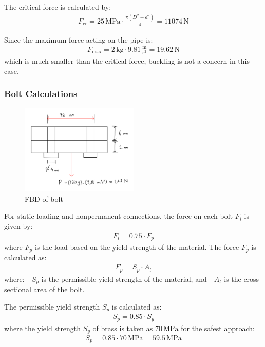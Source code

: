 \documentclass[12pt]{report}
\begin{document}
The critical force is calculated by:
\begin{align}
F_{\text{cr}} = 25 \, \text{MPa} \cdot \frac{\pi (D^2 - d^2)}{4} = 11074 \, \text{N}
\end{align}


Since the maximum force acting on the pipe is:
\begin{align}
F_{\text{max}} = 2 \, \text{kg} \cdot 9.81 \, \frac{\text{m}}{\text{s}^2} = 19.62 \, \text{N}
\end{align}
which is much smaller than the critical force, buckling is not a concern in this case.

\subsubsection{Bolt Calculations}
\begin{figure}[h]
    \centering
    \includegraphics[width=0.5\textwidth]{Figures/bolts.jpg}
    \caption{FBD of bolt}
    \label{fig:bolt}
\end{figure}

For static loading and nonpermanent connections, the force on each bolt \( F_i \) is given by:
\begin{align}
F_i = 0.75 \cdot F_p
\end{align}
where \( F_p \) is the load based on the yield strength of the material. The force \( F_p \) is calculated as:
\begin{align}
F_p = S_p \cdot A_t
\end{align}
where:
- \( S_p \) is the permissible yield strength of the material, and
- \( A_t \) is the cross-sectional area of the bolt.

The permissible yield strength \( S_p \) is calculated as:
\begin{align}
S_p = 0.85 \cdot S_y
\end{align}
where the yield strength \( S_y \) of brass is taken as \( 70 \, \text{MPa} \) for the safest approach:
\begin{align}
S_p = 0.85 \cdot 70 \, \text{MPa} = 59.5 \, \text{MPa}
\end{align}
\end{document}
